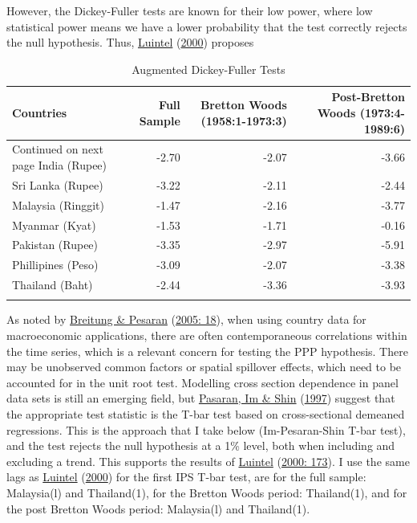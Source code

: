 \documentclass[11pt,preprint, authoryear]{elsarticle}
\numberwithin{equation}{section}
\numberwithin{figure}{section}
\numberwithin{table}{section}
\begin{document}
However, the Dickey-Fuller tests are known for their low power, where
low statistical power means we have a lower probability that the test
correctly rejects the null hypothesis. Thus,
\protect\hyperlink{ref-Kul}{Luintel} (\protect\hyperlink{ref-Kul}{2000})
proposes

\begingroup\fontsize{11pt}{12pt}\selectfont
\begin{longtable}{lrrr}
\caption{Augmented Dickey-Fuller Tests} \\ 
  \toprule
Countries & Full Sample & Bretton Woods (1958:1-1973:3) & Post-Bretton Woods (1973:4-1989:6) \\ 
  \hline 
\endhead 
\hline 
{\footnotesize Continued on next page} 
\endfoot 
\endlastfoot 
 \midrule
India (Rupee) & -2.70 & -2.07 & -3.66 \\ 
  Sri Lanka (Rupee) & -3.22 & -2.11 & -2.44 \\ 
  Malaysia (Ringgit) & -1.47 & -2.16 & -3.77 \\ 
  Myanmar (Kyat) & -1.53 & -1.71 & -0.16 \\ 
  Pakistan (Rupee) & -3.35 & -2.97 & -5.91 \\ 
  Phillipines (Peso) & -3.09 & -2.07 & -3.38 \\ 
  Thailand (Baht) & -2.44 & -3.36 & -3.93 \\ 
   \bottomrule
\label{ADF}
\end{longtable}
\endgroup

As noted by \protect\hyperlink{ref-pes}{Breitung \& Pesaran}
(\protect\hyperlink{ref-pes}{2005: 18}), when using country data for
macroeconomic applications, there are often contemporaneous correlations
within the time series, which is a relevant concern for testing the PPP
hypothesis. There may be unobserved common factors or spatial spillover
effects, which need to be accounted for in the unit root test. Modelling
cross section dependence in panel data sets is still an emerging field,
but \protect\hyperlink{ref-im}{Pasaran, Im \& Shin}
(\protect\hyperlink{ref-im}{1997}) suggest that the appropriate test
statistic is the T-bar test based on cross-sectional demeaned
regressions. This is the approach that I take below (Im-Pesaran-Shin
T-bar test), and the test rejects the null hypothesis at a 1\% level,
both when including and excluding a trend. This supports the results of
\protect\hyperlink{ref-Kul}{Luintel} (\protect\hyperlink{ref-Kul}{2000:
173}). I use the same lags as \protect\hyperlink{ref-Kul}{Luintel}
(\protect\hyperlink{ref-Kul}{2000}) for the first IPS T-bar test, are
for the full sample: Malaysia(l) and Thailand(1), for the Bretton Woods
period: Thailand(1), and for the post Bretton Woods period: Malaysia(l)
and Thailand(1).
\end{document}
